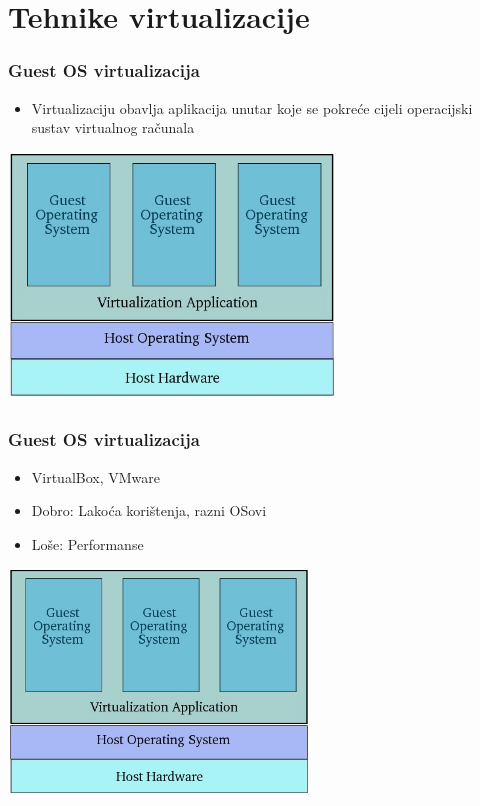\documentclass[t]{beamer}
\begin{document}
\section{Tehnike virtualizacije}

\begin{frame}
	\frametitle{Guest OS virtualizacija}
	\centering
	\begin{itemize}
		\item Virtualizaciju obavlja aplikacija unutar koje se pokreće cijeli operacijski sustav virtualnog računala
	\end{itemize}
	\includegraphics[width=0.65\textwidth]{guest_virt.jpg}
\end{frame}

\begin{frame}
	\frametitle{Guest OS virtualizacija}
	\centering
	\begin{itemize}
    \item VirtualBox, VMware
		\item Dobro: Lakoća korištenja, razni OSovi
    \item Loše: Performanse
	\end{itemize}
	\includegraphics[width=0.60\textwidth]{guest_virt.jpg}
\end{frame}
\end{document}
